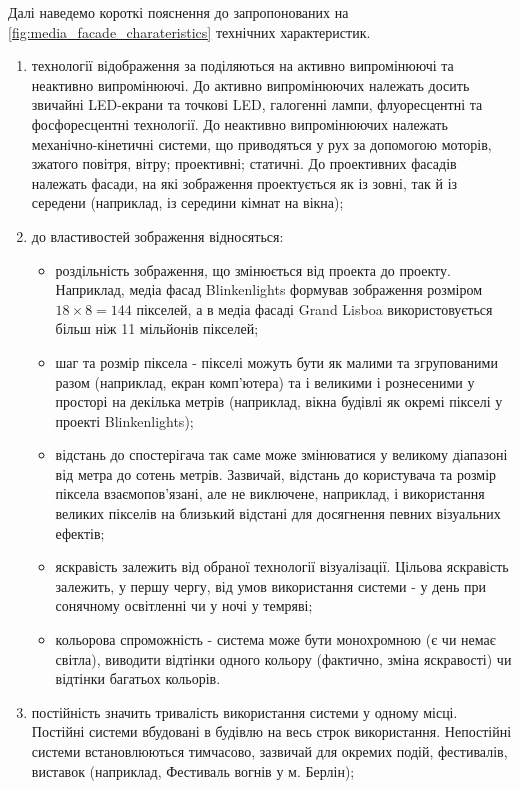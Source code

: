 \documentclass[a4paper,ukrainian,utf8,nocolumnsxix,floatsection,equationsection]{eskdtext}
\begin{document}
\afterpage{\clearpage}

Далі наведемо короткі пояснення до запропонованих на \ref{fig:media_facade_charateristics} технічних характеристик.

\begin{enumerate}
	\item технології відображення за \cite{media:facades:fundamentals} поділяються на активно випромінюючі та неактивно випромінюючі. До активно випромінюючих належать досить звичайні LED-екрани та точкові LED, галогенні лампи, флуоресцентні та фосфоресцентні технології. До неактивно випромінюючих належать механічно-кінетичні системи, що приводяться у рух за допомогою моторів, зжатого повітря, вітру; проективні; статичні. До проективних фасадів належать фасади, на які зображення проектується як із зовні, так й із середени (наприклад, із середини кімнат на вікна);
	\item до властивостей зображення відносяться:
		\begin{itemize}
			\item роздільність зображення, що змінюється від проекта до проекту. Наприклад, медіа фасад Blinkenlights формував зображення розміром $18\times8=144$ пікселей, а в медіа фасаді Grand Lisboa використовується більш ніж 11 мільйонів пікселей;
			\item шаг та розмір піксела - пікселі можуть бути як малими та згрупованими разом (наприклад, екран комп’ютера) та і великими і рознесеними у просторі на декілька метрів (наприклад, вікна будівлі як окремі пікселі у проекті Blinkenlights);
			\item відстань до спостерігача так саме може змінюватися у великому діапазоні від метра до сотень метрів. Зазвичай, відстань до користувача та розмір піксела взаємопов’язані, але не виключене, наприклад, і використання великих пікселів на близький відстані для досягнення певних візуальних ефектів;
			\item яскравість залежить від обраної технології візуалізації. Цільова яскравість залежить, у першу чергу, від умов використання системи - у день при сонячному освітленні чи у ночі у темряві;
			\item кольорова спроможність - система може бути монохромною (є чи немає світла), виводити відтінки одного кольору (фактично, зміна яскравості) чи відтінки багатьох кольорів.
		\end{itemize}
	\item постійність значить тривалість використання системи у одному місці. Постійні системи вбудовані в будівлю на весь строк використання. Непостійні системи встановлюються тимчасово, зазвичай для окремих подій, фестивалів, виставок (наприклад, Фестиваль вогнів у м. Берлін);

\end{enumerate}
\end{document}
